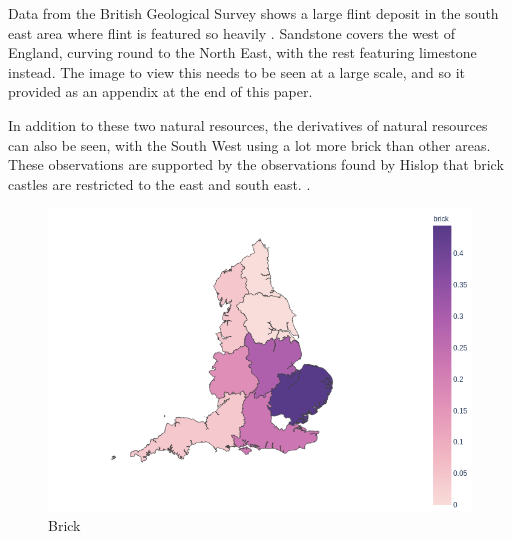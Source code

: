 \documentclass[11pt]{article}
\begin{document}
\vspace{1cm}
Data from the British Geological Survey shows a large flint deposit in the south east area where flint is featured so heavily \cite{bgs}. Sandstone covers the west of England, curving round to the North East, with the rest featuring limestone instead. The image to view this needs to be seen at a large scale, and so it provided as an appendix at the end of this paper.

In addition to these two natural resources, the derivatives of natural resources can also be seen, with the South West using a lot more brick than other areas. These observations are supported by the observations found by Hislop that brick castles are restricted to the east and south east. \cite{HislopMalcolm2016Cb:a}.

\begin{minipage}{0.45\textwidth}
	\begin{figure}[H]
		\centering
		\includegraphics[width=\textwidth]{brick.png}
		\caption{Brick}
	\end{figure}
\end{minipage}
\end{document}
